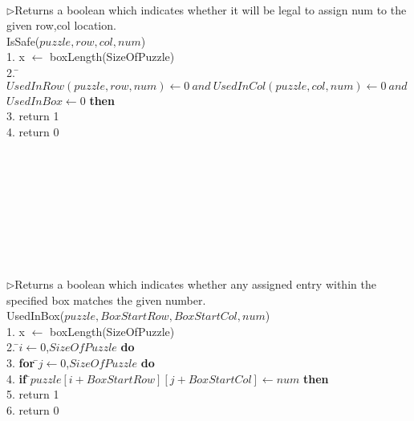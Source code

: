 \documentclass[12pt, letterpaper, twoside]{article}
\begin{document}
            \begin{center}
            \begin{tabbing}
            \\
            $\rhd$Returns a boolean which indicates whether it will be legal to assign
               num to the\\ given row,col location. \\
            IsSafe($puzzle, row, col, num $) \\
            1. \indent x $\leftarrow$ boxLength(SizeOfPuzzle) \\
            2.  \=$UsedInRow(puzzle, row, num ) \leftarrow 0 \: and \: UsedInCol(puzzle,col,num) \leftarrow 0 \: and $ \\  \> $UsedInBox \leftarrow 0$ {\bf then} \\
            3. \indent            \> return 1 \\
            4. \indent return 0 \\ \\ \\ \\ \\ \\ \\ \\ \\
            \end{tabbing}
            \label{fig_alg_ex}
            \end{center}


            \begin{center}
            \begin{tabbing}
            $\rhd$Returns a boolean which indicates whether any assigned entry
                within the\\ specified box matches the given number.\\
            UsedInBox($puzzle, BoxStartRow, BoxStartCol, num $) \\
            1. \indent x $\leftarrow$ boxLength(SizeOfPuzzle) \\
            2.  \=$i \leftarrow 0$,$SizeOfPuzzle$ {\bf do} \\
            3. \indent            \> {\bf for} \=$j \leftarrow 0$,$SizeOfPuzzle$ {\bf do} \\
            4. \indent 	      \> 	\>  {\bf if} \=$puzzle[i + BoxStartRow][j + BoxStartCol] \leftarrow num$ {\bf then} \\
            5. \indent 	      \> 	\> 	\> return 1 \\
            6. \indent return 0 \\
            \end{tabbing}
            \label{fig_alg_ex}
            \end{center}
\end{document}
